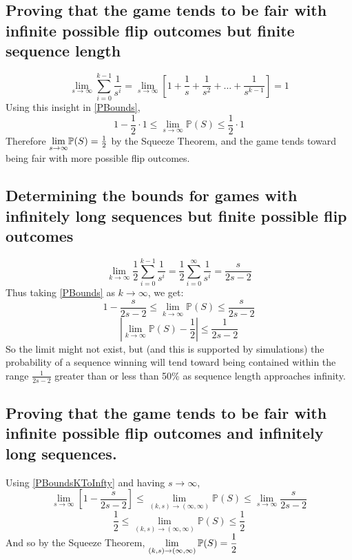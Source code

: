 \documentclass[english,12pt,a4paper,final]{article}
\begin{document}
\subsection{Proving that the game tends to be fair with infinite possible flip outcomes but finite sequence length}

\begin{equation*}
	\lim_{s \rightarrow \infty}\sum_{i=0}^{k-1}\frac{1}{s^i} = \lim_{s \rightarrow \infty} \left[1 + \frac{1}{s} + \frac{1}{s^2} + \dots + \frac{1}{s^{k-1}}\right] = 1
\end{equation*}
Using this insight in \eqref{PBounds},
\begin{equation*}
	1-\frac{1}{2}\cdot1 \le \lim_{s\rightarrow\infty}\mathbb{P}(S) \le \frac{1}{2}\cdot1
\end{equation*}
Therefore $\mathlarger{\lim_{s\rightarrow\infty}}\mathbb{P}(S) = \frac{1}{2}$ by the Squeeze Theorem, and the game tends toward being fair with more possible flip outcomes.

\subsection{Determining the bounds for games with infinitely long sequences but finite possible flip outcomes}
\begin{equation*}
	\lim_{k\rightarrow\infty}\frac{1}{2}\sum_{i=0}^{k-1}\frac{1}{s^i} = \frac{1}{2}\sum_{i=0}^{\infty}\frac{1}{s^i} = \frac{s}{2s-2}
\end{equation*}
Thus taking \eqref{PBounds} as $k\rightarrow\infty$, we get:
\begin{equation}\label{PBoundsKToInfty}
	1-\frac{s}{2s-2} \le \lim_{k\rightarrow\infty} \mathbb{P}(S) \le \frac{s}{2s-2} 
\end{equation}
\begin{equation*}
	\left|\lim_{k\rightarrow\infty}\mathbb{P}(S) - \frac{1}{2}\right| \le \frac{1}{2s-2}
\end{equation*}
So the limit might not exist, but (and this is supported by simulations) the probability of a sequence winning will tend toward being contained within the range $\frac{1}{2s-2}$ greater than or less than 50\% as sequence length approaches infinity.

\subsection{Proving that the game tends to be fair with infinite possible flip outcomes and infinitely long sequences.}
Using \eqref{PBoundsKToInfty} and having $s\rightarrow\infty$,
\begin{equation*}
	\lim_{s\rightarrow\infty}\left[1-\frac{s}{2s-2}\right] \le \lim_{(k, s)\rightarrow(\infty, \infty)} \mathbb{P}(S) \le \lim_{s\rightarrow\infty}\frac{s}{2s-2} 
\end{equation*}
\begin{equation*}
	\frac{1}{2} \le \lim_{(k, s)\rightarrow(\infty, \infty)} \mathbb{P}(S) \le \frac{1}{2}
\end{equation*}
And so by the Squeeze Theorem, $\mathlarger{\lim_{(k, s)\rightarrow(\infty, \infty)} \mathbb{P}(S) = \frac{1}{2}}$
\end{document}
